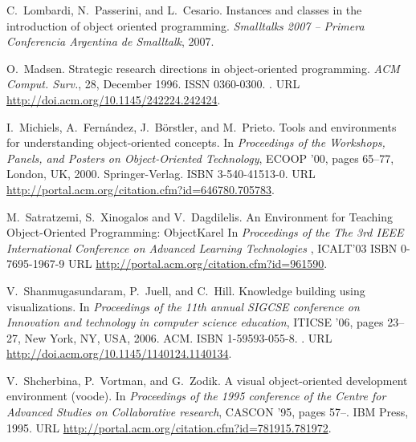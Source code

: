 \documentclass{sigplanconf}
\begin{document}
\begin{thebibliography}{}
C.~Lombardi, N.~Passerini, and L.~Cesario.
\newblock Instances and classes in the introduction of object oriented
  programming.
\newblock \emph{Smalltalks 2007 -- Primera Conferencia Argentina de Smalltalk},
  2007.

O.~Madsen.
\newblock Strategic research directions in object-oriented programming.
\newblock \emph{ACM Comput. Surv.}, 28, December 1996.
\newblock ISSN 0360-0300.
\newblock {}.
\newblock URL \url{http://doi.acm.org/10.1145/242224.242424}.

I.~Michiels, A.~Fern\'{a}ndez, J.~B\"{o}rstler, and M.~Prieto.
\newblock Tools and environments for understanding object-oriented concepts.
\newblock In \emph{Proceedings of the Workshops, Panels, and Posters on
  Object-Oriented Technology}, ECOOP '00, pages 65--77, London, UK, 2000.
  Springer-Verlag.
\newblock ISBN 3-540-41513-0.
\newblock URL \url{http://portal.acm.org/citation.cfm?id=646780.705783}.

M.~Satratzemi, S.~Xinogalos and V.~Dagdilelis.
\newblock An Environment for Teaching Object-Oriented Programming: ObjectKarel
\newblock In \emph{Proceedings of the The 3rd IEEE International Conference on Advanced Learning Technologies
}, ICALT’03
\newblock ISBN 0-7695-1967-9
\newblock URL \url{http://portal.acm.org/citation.cfm?id=961590}.

V.~Shanmugasundaram, P.~Juell, and C.~Hill.
\newblock Knowledge building using visualizations.
\newblock In \emph{Proceedings of the 11th annual SIGCSE conference on
  Innovation and technology in computer science education}, ITICSE '06, pages
  23--27, New York, NY, USA, 2006. ACM.
\newblock ISBN 1-59593-055-8.
\newblock {}.
\newblock URL \url{http://doi.acm.org/10.1145/1140124.1140134}.

V.~Shcherbina, P.~Vortman, and G.~Zodik.
\newblock A visual object-oriented development environment (voode).
\newblock In \emph{Proceedings of the 1995 conference of the Centre for
  Advanced Studies on Collaborative research}, CASCON '95, pages 57--. IBM
  Press, 1995.
\newblock URL \url{http://portal.acm.org/citation.cfm?id=781915.781972}.


\end{thebibliography}
\end{document}
